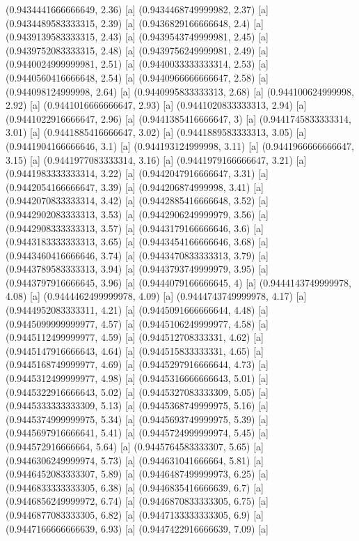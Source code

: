 {{{(0.9434441666666649, 2.36) [a] 
(0.9434468749999982, 2.37) [a] 
(0.9434489583333315, 2.39) [a] 
(0.9436829166666648, 2.4) [a] 
(0.9439139583333315, 2.43) [a] 
(0.9439543749999981, 2.45) [a] 
(0.9439752083333315, 2.48) [a] 
(0.9439756249999981, 2.49) [a] 
(0.9440024999999981, 2.51) [a] 
(0.9440033333333314, 2.53) [a] 
(0.9440560416666648, 2.54) [a] 
(0.9440966666666647, 2.58) [a] 
(0.944098124999998, 2.64) [a] 
(0.9440995833333313, 2.68) [a] 
(0.944100624999998, 2.92) [a] 
(0.9441016666666647, 2.93) [a] 
(0.9441020833333313, 2.94) [a] 
(0.9441022916666647, 2.96) [a] 
(0.9441385416666647, 3) [a] 
(0.9441745833333314, 3.01) [a] 
(0.9441885416666647, 3.02) [a] 
(0.9441889583333313, 3.05) [a] 
(0.9441904166666646, 3.1) [a] 
(0.944193124999998, 3.11) [a] 
(0.9441966666666647, 3.15) [a] 
(0.9441977083333314, 3.16) [a] 
(0.9441979166666647, 3.21) [a] 
(0.9441983333333314, 3.22) [a] 
(0.9442047916666647, 3.31) [a] 
(0.9442054166666647, 3.39) [a] 
(0.944206874999998, 3.41) [a] 
(0.9442070833333314, 3.42) [a] 
(0.9442885416666648, 3.52) [a] 
(0.9442902083333313, 3.53) [a] 
(0.9442906249999979, 3.56) [a] 
(0.9442908333333313, 3.57) [a] 
(0.9443179166666646, 3.6) [a] 
(0.9443183333333313, 3.65) [a] 
(0.9443454166666646, 3.68) [a] 
(0.9443460416666646, 3.74) [a] 
(0.9443470833333313, 3.79) [a] 
(0.9443789583333313, 3.94) [a] 
(0.9443793749999979, 3.95) [a] 
(0.9443797916666645, 3.96) [a] 
(0.9444079166666645, 4) [a] 
(0.9444143749999978, 4.08) [a] 
(0.9444462499999978, 4.09) [a] 
(0.9444743749999978, 4.17) [a] 
(0.9444952083333311, 4.21) [a] 
(0.9445091666666644, 4.48) [a] 
(0.9445099999999977, 4.57) [a] 
(0.9445106249999977, 4.58) [a] 
(0.9445112499999977, 4.59) [a] 
(0.944512708333331, 4.62) [a] 
(0.9445147916666643, 4.64) [a] 
(0.944515833333331, 4.65) [a] 
(0.9445168749999977, 4.69) [a] 
(0.9445297916666644, 4.73) [a] 
(0.9445312499999977, 4.98) [a] 
(0.9445316666666643, 5.01) [a] 
(0.9445322916666643, 5.02) [a] 
(0.9445327083333309, 5.05) [a] 
(0.9445333333333309, 5.13) [a] 
(0.9445368749999975, 5.16) [a] 
(0.9445374999999975, 5.34) [a] 
(0.9445693749999975, 5.39) [a] 
(0.9445697916666641, 5.41) [a] 
(0.9445724999999974, 5.45) [a] 
(0.944572916666664, 5.64) [a] 
(0.9445764583333307, 5.65) [a] 
(0.9446306249999974, 5.73) [a] 
(0.944631041666664, 5.81) [a] 
(0.9446452083333307, 5.89) [a] 
(0.9446487499999973, 6.25) [a] 
(0.9446833333333305, 6.38) [a] 
(0.9446835416666639, 6.7) [a] 
(0.9446856249999972, 6.74) [a] 
(0.9446870833333305, 6.75) [a] 
(0.9446877083333305, 6.82) [a] 
(0.9447133333333305, 6.9) [a] 
(0.9447166666666639, 6.93) [a] 
(0.9447422916666639, 7.09) [a] 
}}}
